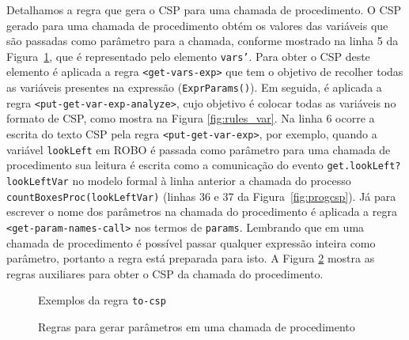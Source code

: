 Detalhamos a regra que gera o CSP para uma chamada de procedimento. O CSP gerado para uma chamada de procedimento 
obtém os valores das variáveis que são passadas como parâmetro para a chamada, conforme mostrado na linha 5 da Figura~\ref{fig:to_csp}, que é representado pelo elemento \texttt{vars'}. Para obter o CSP deste elemento é aplicada a regra \texttt{<get-vars-exp>} que tem o objetivo de recolher todas as variáveis presentes na expressão (\texttt{ExprParams()}). Em seguida, é aplicada a regra \texttt{<put-get-var-exp-analyze>}, cujo objetivo é colocar todas as variáveis no formato de CSP, como mostra na Figura \ref{fig:rules_var}. Na linha 6 ocorre a escrita do texto CSP pela regra \texttt{<put-get-var-exp>}, por exemplo, quando a variável \texttt{lookLeft} em ROBO é passada como parâmetro para uma chamada de procedimento sua leitura é escrita como a comunicação do evento \texttt{get.lookLeft?lookLeftVar} no modelo formal à linha anterior a chamada do processo \texttt{countBoxesProc(lookLeftVar)} (linhas 36 e 37 da Figura~\ref{fig:progcsp}). Já para escrever o nome dos parâmetros na chamada do procedimento é aplicada a regra  \texttt{<get-param-names-call>} nos termos de \texttt{params}. Lembrando que em uma chamada de procedimento é possível passar qualquer expressão inteira como parâmetro, portanto a regra está preparada para isto. A Figura \ref{fig:rules_param} mostra as regras auxiliares para obter o CSP da chamada do procedimento.

\begin{figure}[!h]
\centering
\caption{Exemplos da regra \texttt{to-csp}}

\label{fig:to_csp}
\end{figure}

\begin{figure}[!h]
\centering
\caption{Regras para gerar parâmetros em uma chamada de procedimento}

\label{fig:rules_param}
\end{figure}


